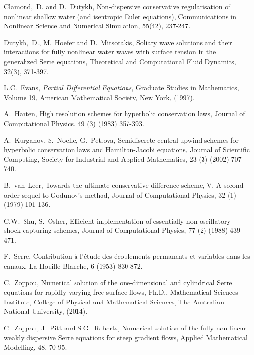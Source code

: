 \documentclass[10pt]{article}
\begin{document}
\begin{thebibliography}{99}

Clamond,~D. and D.~Dutykh, Non-dispersive conservative regularisation of nonlinear shallow water (and isentropic Euler equations), Communications in Nonlinear Science and Numerical Simulation, 55(42), 237-247.

Dutykh,~D., M.~Hoefer and D.~Mitsotakis, Soliary wave solutions and their interactions for fully nonlinear water waves with surface tension in the generalized Serre equations, Theoretical and Computational Fluid Dynamics, 32(3), 371-397.

 L.C.~Evans, \emph{Partial Differential Equations}, Graduate Studies in Mathematics, Volume 19, American Mathematical Society, New York, (1997).

  A.~Harten, High resolution schemes for hyperbolic conservation laws, Journal of Computational Physics,  49 (3) (1983) 357-393.

 A.~Kurganov, S.~Noelle, G.~Petrova, Semidiscrete central-upwind schemes for hyperbolic conservation laws and Hamilton-Jacobi equations, Journal of Scientific Computing, Society for Industrial and Applied Mathematics, 23 (3) (2002) 707-740.

 B.~van~Leer, Towards the ultimate conservative difference scheme, V. A second-order sequel to Godunov's method, Journal of Computational Physics, 32 (1) (1979) 101-136.

 C.W.~Shu, S.~Osher, Efficient implementation of essentially non-oscillatory shock-capturing schemes, Journal of Computational Physics,  77 (2) (1988) 439-471.

 F.~Serre, Contribution \`{a} l'\'{e}tude des \'{e}coulements permanents et variables dans les canaux, La Houille Blanche, 6 (1953) 830-872.

 C.~Zoppou, Numerical solution of the one-dimensional and cylindrical Serre equations for rapidly varying free surface flows, Ph.D., Mathematical Sciences Institute, College of Physical and Mathematical Sciences, The Australian National University, (2014).

C.~Zoppou, J.~Pitt and S.G.~Roberts, Numerical solution of the fully non-linear weakly dispersive Serre equations for steep gradient flows, Applied Mathematical Modelling, 48, 70-95.

\end{thebibliography}
\end{document}
